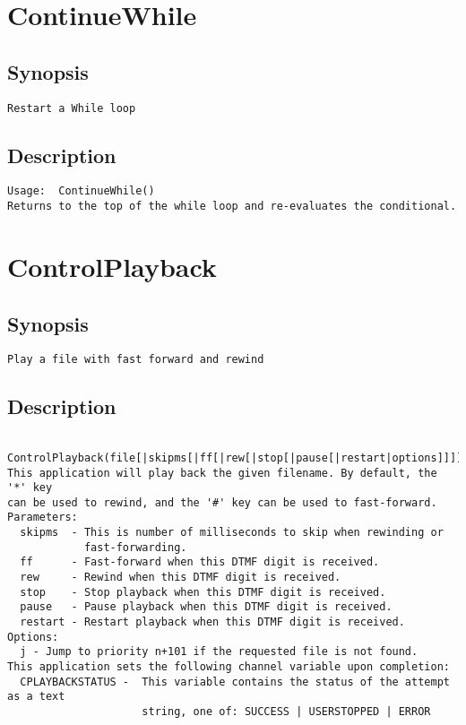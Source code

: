 \section{ContinueWhile}
\subsection{Synopsis}
\begin{verbatim}
Restart a While loop
\end{verbatim}
\subsection{Description}
\begin{verbatim}
Usage:  ContinueWhile()
Returns to the top of the while loop and re-evaluates the conditional.

\end{verbatim}


\section{ControlPlayback}
\subsection{Synopsis}
\begin{verbatim}
Play a file with fast forward and rewind
\end{verbatim}
\subsection{Description}
\begin{verbatim}
  ControlPlayback(file[|skipms[|ff[|rew[|stop[|pause[|restart|options]]]]]]]):
This application will play back the given filename. By default, the '*' key
can be used to rewind, and the '#' key can be used to fast-forward.
Parameters:
  skipms  - This is number of milliseconds to skip when rewinding or
            fast-forwarding.
  ff      - Fast-forward when this DTMF digit is received.
  rew     - Rewind when this DTMF digit is received.
  stop    - Stop playback when this DTMF digit is received.
  pause   - Pause playback when this DTMF digit is received.
  restart - Restart playback when this DTMF digit is received.
Options:
  j - Jump to priority n+101 if the requested file is not found.
This application sets the following channel variable upon completion:
  CPLAYBACKSTATUS -  This variable contains the status of the attempt as a text
                     string, one of: SUCCESS | USERSTOPPED | ERROR

\end{verbatim}


